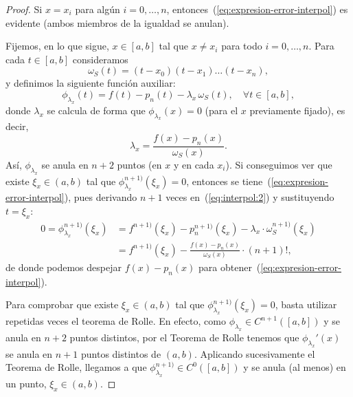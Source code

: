 \begin{proof}
  Si $x=x_i$ para algún $i=0,\dots,n$,
  entonces~(\ref{eq:expresion-error-interpol}) es evidente (ambos
  miembros de la igualdad se anulan).

  Fijemos, en lo que sigue, $x\in[a,b]$ tal que
  $x\neq x_i$ para todo $i=0,\dots,n$. Para cada $t\in[a,b]$ consideramos
  \begin{equation}
    \omega_S(t)=(t-x_0)(t-x_1)\dots (t-x_n),
    \label{eq:w_S:3}
  \end{equation}
  y definimos la siguiente función auxiliar:
  \begin{equation}
    \phi_{\lambda_x}(t)=f(t)-p_n(t)-\lambda_x\, \omega_S(t), \quad \forall t\in[a,b],
    \label{eq:interpol:2}
  \end{equation}
  donde $\lambda_x$ se calcula de forma que $\phi_{\lambda_x}(x)=0$ (para el $x$
  previamente fijado), es decir,
  $$
  \lambda_x = \frac{f(x)-p_n(x)}{\omega_S(x)}.
  $$
  Así, $\phi_{\lambda_x}$ se anula en $n+2$ puntos (en $x$ y en cada
  $x_i$).
  Si conseguimos ver que existe $\xi_x\in (a,b)$ tal que
  $\phi_{\lambda_x}^{n+1)}(\xi_x)=0$, entonces se
  tiene~(\ref{eq:expresion-error-interpol}), pues derivando $n+1$
  veces en~(\ref{eq:interpol:2}) y sustituyendo $t=\xi_x$:
  \begin{align*}
    0=\phi_{\lambda_x}^{n+1)}(\xi_x)&=f^{n+1)}(\xi_x)-p_n^{n+1)}(\xi_x)-\lambda_x\cdot\omega_S^{n+1)}(\xi_x)
    \\
                        &=f^{n+1)}(\xi_x)- \frac{f(x)-p_n(x)}{\omega_S(x)}\cdot (n+1)!,
  \end{align*}
  de donde podemos despejar $f(x)-p_n(x)$ para
  obtener~(\ref{eq:expresion-error-interpol}).

  Para comprobar que existe $\xi_x\in (a,b)$ tal que
  $\phi_{\lambda_x}^{n+1)}(\xi_x)=0$, basta utilizar repetidas veces
  el teorema de Rolle. En efecto, como
  $\phi_{\lambda_x}\in C^{n+1}([a,b])$ y se anula en $n+2$ puntos
  distintos, por el Teorema de Rolle tenemos que
  $\phi_{\lambda_x}'(x)$ se anula en $n+1$ puntos distintos de
  $(a,b)$. Aplicando sucesivamente el Teorema de Rolle, llegamos a que
  $\phi_{\lambda_x}^{n+1)}\in C^0([a,b])$ y se anula (al menos) en un
  punto, $\xi_x\in (a,b)$.
\end{proof}

